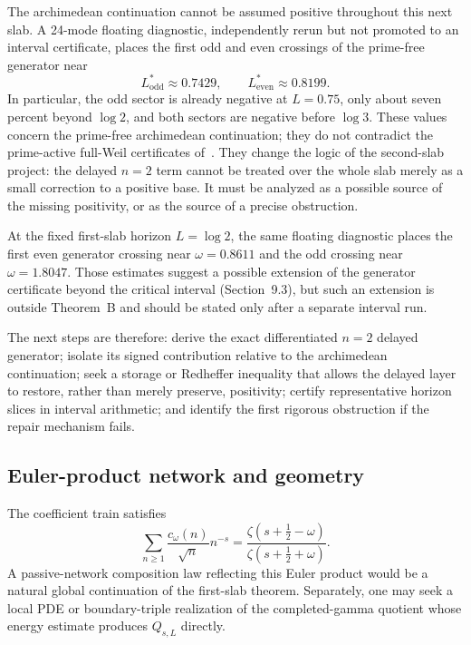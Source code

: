 \documentclass[11pt,a4paper]{article}
\theoremstyle{plain}
\theoremstyle{definition}
\numberwithin{equation}{section}
\begin{document}
The archimedean continuation cannot be assumed positive throughout this next
slab. A 24-mode floating diagnostic, independently rerun but not promoted to
an interval certificate, places the first odd and even crossings of the
prime-free generator near
\begin{equation}
L^{*}_{\mathrm{odd}}\approx0.7429,\qquad L^{*}_{\mathrm{even}}\approx0.8199 .
\end{equation}
In particular, the odd sector is already negative at $L=0.75$, only about
seven percent beyond $\log2$, and both sectors are negative before $\log3$.
These values concern the prime-free archimedean continuation; they do not
contradict the prime-active full-Weil certificates of~\cite{Zhu2026}. They
change the logic of the second-slab project: the delayed $n=2$ term cannot be
treated over the whole slab merely as a small correction to a positive base.
It must be analyzed as a possible source of the missing positivity, or as the
source of a precise obstruction.

At the fixed first-slab horizon $L=\log2$, the same floating diagnostic places
the first even generator crossing near $\omega=0.8611$ and the odd crossing
near $\omega=1.8047$. Those estimates suggest a possible extension of the
generator certificate beyond the critical interval (Section~9.3), but such an
extension is outside Theorem~B and should be stated only after a separate
interval run.

The next steps are therefore: derive the exact differentiated $n=2$ delayed
generator; isolate its signed contribution relative to the archimedean
continuation; seek a storage or Redheffer inequality that allows the delayed
layer to restore, rather than merely preserve, positivity; certify
representative horizon slices in interval arithmetic; and identify the first
rigorous obstruction if the repair mechanism fails.

\subsection{Euler-product network and geometry}

The coefficient train satisfies
\begin{equation}
\sum_{n\ge1}\frac{c_\omega(n)}{\sqrt n}n^{-s}
=\frac{\zeta(s+\tfrac12-\omega)}{\zeta(s+\tfrac12+\omega)} .
\end{equation}
A passive-network composition law reflecting this Euler product would be a
natural global continuation of the first-slab theorem. Separately, one may
seek a local PDE or boundary-triple realization of the completed-gamma
quotient whose energy estimate produces $Q_{s,L}$ directly.
\end{document}
